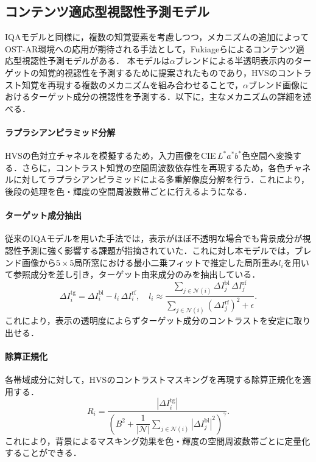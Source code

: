 \documentclass[a4j,10pt,fleqn]{rinkoj}
\begin{document}
\subsection{コンテンツ適応型視認性予測モデル}
IQAモデルと同様に，複数の知覚要素を考慮しつつ，メカニズムの追加によってOST-AR環境への応用が期待される手法として，Fukiageらによるコンテンツ適応型視認性予測モデルがある\cite{Fukiage2023Contentadap}．
本モデルは$\alpha$ブレンドによる半透明表示内のターゲットの知覚的視認性を予測するために提案されたものであり，HVSのコントラスト知覚を再現する複数のメカニズムを組み合わせることで，$\alpha$ブレンド画像におけるターゲット成分の視認性を予測する．以下に，主なメカニズムの詳細を述べる．

\paragraph{ラプラシアンピラミッド分解}
HVSの色対立チャネルを模擬するため，入力画像をCIE\,$L^{*}a^{*}b^{*}$色空間へ変換する．さらに，コントラスト知覚の空間周波数依存性を再現するため，各色チャネルに対してラプラシアンピラミッドによる多重解像度分解を行う．これにより，後段の処理を色・輝度の空間周波数帯ごとに行えるようになる．

\paragraph{ターゲット成分抽出}
従来のIQAモデルを用いた手法\cite{Fukiage2014Vbb}では，表示がほぼ不透明な場合でも背景成分が視認性予測に強く影響する課題が指摘されていた．これに対し本モデルでは，ブレンド画像から$5\times 5$局所窓における最小二乗フィットで推定した局所重み$l_i$を用いて参照成分を差し引き，ターゲット由来成分のみを抽出している．
\begin{equation}
\Delta I_{i}^{\mathrm{tg}} = \Delta I_{i}^{\mathrm{bl}} - l_{i}\,\Delta I_{i}^{\mathrm{rf}},\quad
l_{i} \approx \frac{\sum_{j \in \mathcal{N}(i)} \Delta I_{j}^{\mathrm{bl}}\,\Delta I_{j}^{\mathrm{rf}}}
{\sum_{j \in \mathcal{N}(i)} \left(\Delta I_{j}^{\mathrm{rf}}\right)^{2} + \epsilon}.
\label{eq:target_extraction}
\end{equation}
これにより，表示の透明度によらずターゲット成分のコントラストを安定に取り出せる．

\paragraph{除算正規化}
各帯域成分に対して，HVSのコントラストマスキングを再現する除算正規化を適用する．
\begin{equation}
R_{i} = \frac{\left|\Delta I_{i}^{\mathrm{tg}}\right|}
{\left(B^{2} + \dfrac{1}{|\mathcal{N}|}\displaystyle\sum_{j \in \mathcal{N}(i)} \left|\Delta I_{j}^{\mathrm{bl}}\right|^{2}\right)^{\gamma}}.
\label{eq:divisive_normalization}
\end{equation}
これにより，背景によるマスキング効果を色・輝度の空間周波数帯ごとに定量化することができる．
\end{document}
